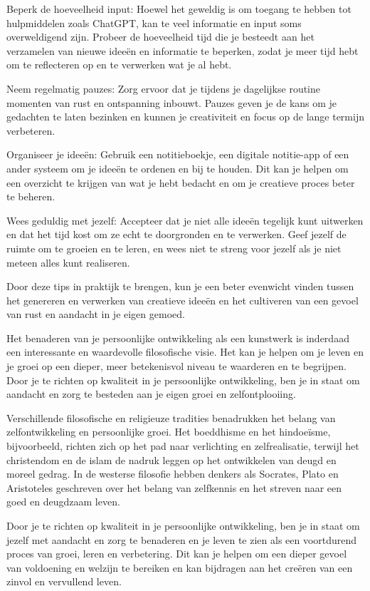 Beperk de hoeveelheid input: Hoewel het geweldig is om toegang te hebben tot hulpmiddelen zoals ChatGPT, kan te veel informatie en input soms overweldigend zijn. Probeer de hoeveelheid tijd die je besteedt aan het verzamelen van nieuwe ideeën en informatie te beperken, zodat je meer tijd hebt om te reflecteren op en te verwerken wat je al hebt.

Neem regelmatig pauzes: Zorg ervoor dat je tijdens je dagelijkse routine momenten van rust en ontspanning inbouwt. Pauzes geven je de kans om je gedachten te laten bezinken en kunnen je creativiteit en focus op de lange termijn verbeteren.

Organiseer je ideeën: Gebruik een notitieboekje, een digitale notitie-app of een ander systeem om je ideeën te ordenen en bij te houden. Dit kan je helpen om een overzicht te krijgen van wat je hebt bedacht en om je creatieve proces beter te beheren.

Wees geduldig met jezelf: Accepteer dat je niet alle ideeën tegelijk kunt uitwerken en dat het tijd kost om ze echt te doorgronden en te verwerken. Geef jezelf de ruimte om te groeien en te leren, en wees niet te streng voor jezelf als je niet meteen alles kunt realiseren.

Door deze tips in praktijk te brengen, kun je een beter evenwicht vinden tussen het genereren en verwerken van creatieve ideeën en het cultiveren van een gevoel van rust en aandacht in je eigen gemoed.

Het benaderen van je persoonlijke ontwikkeling als een kunstwerk is inderdaad een interessante en waardevolle filosofische visie. Het kan je helpen om je leven en je groei op een dieper, meer betekenisvol niveau te waarderen en te begrijpen. Door je te richten op kwaliteit in je persoonlijke ontwikkeling, ben je in staat om aandacht en zorg te besteden aan je eigen groei en zelfontplooiing.

Verschillende filosofische en religieuze tradities benadrukken het belang van zelfontwikkeling en persoonlijke groei. Het boeddhisme en het hindoeïsme, bijvoorbeeld, richten zich op het pad naar verlichting en zelfrealisatie, terwijl het christendom en de islam de nadruk leggen op het ontwikkelen van deugd en moreel gedrag. In de westerse filosofie hebben denkers als Socrates, Plato en Aristoteles geschreven over het belang van zelfkennis en het streven naar een goed en deugdzaam leven.

Door je te richten op kwaliteit in je persoonlijke ontwikkeling, ben je in staat om jezelf met aandacht en zorg te benaderen en je leven te zien als een voortdurend proces van groei, leren en verbetering. Dit kan je helpen om een dieper gevoel van voldoening en welzijn te bereiken en kan bijdragen aan het creëren van een zinvol en vervullend leven.
